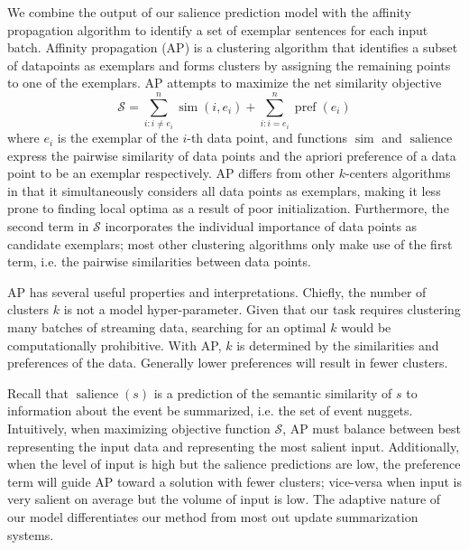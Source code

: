 We combine the output of our salience prediction model with the affinity
propagation algorithm to identify a set of exemplar sentences 
for each input batch. 
Affinity propagation (AP) is a clustering algorithm
that identifies a subset of datapoints as exemplars and forms clusters
by assigning the remaining points to one of the exemplars. AP attempts to 
maximize the net similarity objective 
\[ \mathcal{S} = \sum_{i : i \neq e_i}^n \operatorname{sim}(i,e_i) 
+ \sum_{i : i = e_i}^n \operatorname{pref}(e_i)  \]
where $e_i$ is the exemplar of the $i$-th data point, and functions
$\operatorname{sim}$ and $\operatorname{salience}$ express the pairwise 
similarity
of data points and the apriori preference of a data point to be an exemplar
respectively. 
AP differs from other $k$-centers algorithms in that it simultaneously 
considers all data points as exemplars, making it less prone to finding
local optima as a result of poor initialization. Furthermore, the 
second term in $\mathcal{S}$ incorporates the individual importance of 
data points as candidate exemplars; most other clustering algorithms only make
use of the first term, i.e. the pairwise similarities between data points.
 

AP has several useful properties and interpretations. Chiefly, the number
of clusters $k$ is not a model hyper-parameter. Given that our task requires
clustering many batches of streaming data, searching for an optimal $k$ 
would be computationally prohibitive. With AP, $k$ is determined by the
similarities and preferences of the data. Generally lower preferences will
result in fewer clusters.  


Recall that $\operatorname{salience}(s)$
is a prediction of the semantic similarity of $s$ to information about the 
event be summarized, i.e. the set of event nuggets.
Intuitively, when maximizing objective function $\mathcal{S}$, AP must balance
between best representing the input data and representing the most salient
input. Additionally, when the level of input is high but the salience
predictions are low, the preference term will guide AP toward a solution
with fewer clusters; vice-versa when input is very salient on average but
the volume of input is low. The adaptive nature of our model differentiates
our method from most out update summarization systems.




